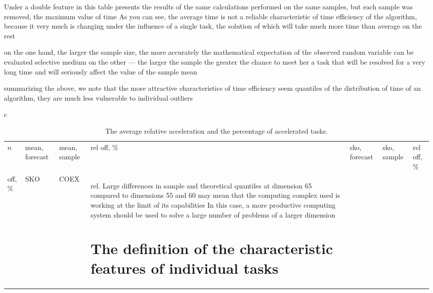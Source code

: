 \documentclass[12pt]{article}
\begin{document}
{ 
 Under a double feature in this table presents the results of the same calculations performed on the same samples, but each sample was removed, the maximum value of time
As you can see, the average time is not a reliable characteristic of time efficiency of the algorithm, because it very much is changing under the influence of a single task, the solution of which will take much more time than average on the rest
 
 
 on the one hand, the larger the sample size, the more accurately the mathematical expectation of the observed random variable can be evaluated selective medium
on the other --- the larger the sample the greater the chance to meet her a task that will be resolved for a very long time and will seriously affect the value of the sample mean

 
 summarizing the above, we note that the more attractive characteristics of time efficiency seem quantiles of the distribution of time of an algorithm, they are much less vulnerable to individual outliers

 \begin{table}[H] 
 \caption{ The average relative acceleration and the percentage of accelerated tasks.} 
 \begin{tabular}{c} 
 \begin{tabular}{|p{0.5 cm}|p{2cm}|p{2cm}|p{2cm}|p{2cm}|p{1.5 cm}|} 
 \hline 
 $n$ & mean, forecast&mean, sample&rel
 off, \%& sko, forecast&sko, sample&rel
 off, \%\\ 
 off, \%& SKO&COEX &rel. Large differences in sample and theoretical quantiles at dimension 65 compared to dimensions 55 and 60 may mean that the computing complex used is working at the limit of its capabilities
 In this case, a more productive computing system should be used to solve a large number of problems of a larger dimension

 
 \section{The definition of the characteristic features of individual tasks} 


\end{tabular}
\end{tabular}
\end{table}}
\end{document}
